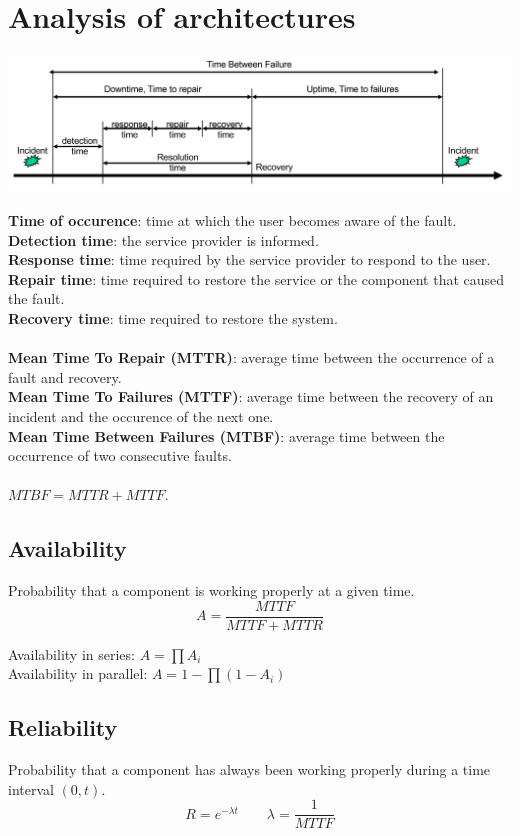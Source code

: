 \section{Analysis of architectures}
\begin{minipage}{0.4\linewidth}
\includegraphics[angle=90, origin=c, width=\linewidth]{6-design/lifecycle-failure.png}
\end{minipage}
\begin{minipage}{0.58\linewidth}
\textbf{Time of occurence}: time at which the user becomes aware of the fault.\\
\textbf{Detection time}: the service provider is informed.\\
\textbf{Response time}: time required by the service provider to respond to the user.\\
\textbf{Repair time}: time required to restore the service or the component that caused the fault.\\
\textbf{Recovery time}: time required to restore the system.\\ \\
\textbf{Mean Time To Repair (MTTR)}: average time between the occurrence of a fault and recovery.\\
\textbf{Mean Time To Failures (MTTF)}: average time between the recovery of an incident and the occurence of the next one.\\
\textbf{Mean Time Between Failures (MTBF)}: average time between the occurrence of two consecutive faults.\\ \\

$MTBF = MTTR + MTTF$.
\end{minipage}

\subsection{Availability}
Probability that a component is working properly at a given time.
\[ A = \frac{MTTF}{MTTF + MTTR} \]

Availability in series: $A = \prod A_i$\\
Availability in parallel: $A = 1 - \prod (1 - A_i)$

\subsection{Reliability}
Probability that a component has always been working properly during a time interval $(0, t)$.
\[ R = e^{-\lambda t} \qquad \lambda =\frac{1}{MTTF} \]
